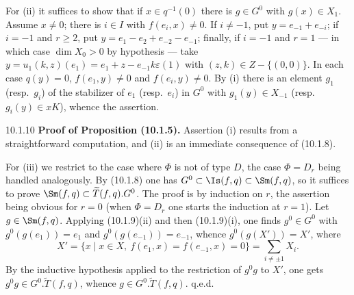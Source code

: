 \documentclass[12pt,a4paper,oneside,english]{smfart}
\makeatletter
\newcommand{\btanchor}[1]{\leavevmode\Hy@raisedlink{\hypertarget{bt:#1}{}}}
\theoremstyle{definition}
\theoremstyle{bt}
\makeatother
\begin{document}
For (ii) it suffices to show that if $x\in q^{-1}(0)$ there is $g\in G^{0}$ with
$g(x)\in X_1$. Assume $x\neq0$; there is $i\in I$ with $f(e_i,x)\neq0$. If
$i\neq-1$, put $y=e_{-1}+e_{-i}$; if $i=-1$ and $r\ge2$, put
$y=e_1-e_2+e_{-2}-e_{-1}$; finally, if $i=-1$ and $r=1$ --- in which case
$\dim X_0>0$ by hypothesis --- take
$y=u_1(k,z)(e_1)=e_1+z-e_{-1}k\varepsilon(1)$ with $(z,k)\in Z-\{(0,0)\}$. In
each case $q(y)=0$, $f(e_1,y)\neq0$ and $f(e_i,y)\neq0$. By (i) there is an
element $g_1$ (resp.\ $g_i$) of the stabilizer of $e_1$ (resp.\ $e_i$) in
$G^{0}$ with $g_1(y)\in X_{-1}$ (resp.\ $g_i(y)\in xK$), whence the assertion.

\num{10.1.10}\btanchor{10.1.10} \textbf{Proof of Proposition (10.1.5).}
Assertion (i) results from a straightforward computation, and (ii) is an
immediate consequence of (10.1.8).

For (iii) we restrict to the case where $\Phi$ is not of type $D$, the case
$\Phi=D_r$ being handled analogously. By (10.1.8) one has
$G^{0}\subset\Is(f,q)\subset\Sm(f,q)$, so it suffices to prove
$\Sm(f,q)\subset\widetilde T(f,q).G^{0}$. The proof is by induction on $r$, the
assertion being obvious for $r=0$ (when $\Phi=D_r$ one starts the induction at
$r=1$). Let $g\in\Sm(f,q)$. Applying (10.1.9)(ii) and then (10.1.9)(i), one
finds $g^{0}\in G^{0}$ with $g^{0}(g(e_1))=e_1$ and
$g^{0}(g(e_{-1}))=e_{-1}$, whence $g^{0}(g(X'))=X'$, where
\[
X'=\{x\mid x\in X,\ f(e_1,x)=f(e_{-1},x)=0\}=\sum_{i\neq\pm1}X_i .
\]
By the inductive hypothesis applied to the restriction of $g^{0}g$ to $X'$, one
gets $g^{0}g\in G^{0}.\widetilde T(f,q)$, whence
$g\in G^{0}.\widetilde T(f,q)$. \hfill q.e.d.
\end{document}
